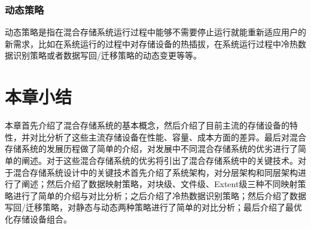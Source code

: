 \subsubsection{动态策略}

动态策略是指在混合存储系统运行过程中能够不需要停止运行就能重新适应用户的新需求，比如在系统运行的过程中对存储设备的热插拔，在系统运行过程中冷热数据识别策略或者数据写回/迁移策略的动态变更等等。

\section{本章小结}

本章首先介绍了混合存储系统的基本概念，然后介绍了目前主流的存储设备的特性，并对比分析了这些主流存储设备在性能、容量、成本方面的差异。最后对混合存储系统的发展历程做了简单的介绍，对发展中不同混合存储系统的优劣进行了简单的阐述。对于这些混合存储系统的优劣将引出了混合存储系统中的关键技术。对于混合存储系统设计中的关键技术首先介绍了系统架构，对分层架构和同层架构进行了阐述；然后介绍了数据映射策略，对块级、文件级、Extent级三种不同映射策略进行了简单的介绍与对比分析；之后介绍了冷热数据识别策略；然后介绍了数据写回/迁移策略，对静态与动态两种策略进行了简单的对比分析；最后介绍了最优化存储设备组合。
